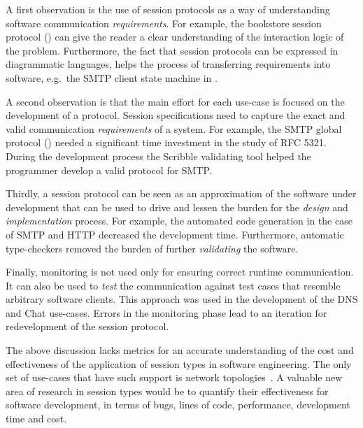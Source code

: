 A first observation is the use of session protocols
as a way of understanding software communication
{\em requirements}. For example, the bookstore
session protocol () can give
the reader a clear understanding of the interaction logic of
the problem. Furthermore, the fact that session protocols
can be expressed in diagrammatic languages, helps
the process of transferring requirements into software,
e.g.~the SMTP client state machine in .

A second observation is that the main effort for each use-case
is focused on the development of a protocol.
Session specifications need to capture the exact
and valid communication {\em requirements} of a system.
For example, the SMTP global protocol () %
needed a significant time investment in the study of RFC 5321. %
During the development process the Scribble validating tool
helped the programmer develop a valid protocol for SMTP.

Thirdly, a session protocol can be seen as an approximation
of the software under development that can be used to drive
and lessen the burden for the {\em design} and {\em implementation} process.
For example, the automated code generation in the case of
SMTP and HTTP decreased the development time. Furthermore,
automatic type-checkers removed the burden of further
{\em validating} the software.

Finally, monitoring is not used only for ensuring
correct runtime communication.
It can also be used to {\em test} the communication
against test cases that resemble arbitrary software clients.
This approach was used in the development of the DNS and
Chat use-cases. Errors in the monitoring phase
lead to an iteration for redevelopment of the session protocol.

The above discussion lacks metrics
for an accurate understanding of the cost and effectiveness
of the application of session types in software engineering.
The only set of use-cases that have such support is network
topologies~\cite{NCY2015}. 
A valuable new area of research in session types would
be to quantify their effectiveness for software development,
in terms of bugs, lines of code, performance, development time and cost.



